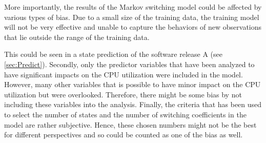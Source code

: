 More importantly, the results of the Markov switching model could
be affected by various types of bias. Due to a small size of the training
data, the training model will not be very effective and unable to
capture the behaviors of new observations that lie outside the range
of the training data. %
\begin{comment}
For this reason, a prediction for the new observations might not be
accurate as it should be. 
\end{comment}
This could be seen in a state prediction of the software release A
(see \ref{sec:Predict}). Secondly, only the predictor variables that
have been analyzed to have significant impacts on the CPU utilization
were included in the model. However, many other variables that is
possible to have minor impact on the CPU utilization but were overlooked.
Therefore, there might be some bias by not including these variables
into the analysis. Finally, the criteria that has been used to select
the number of states and the number of switching coefficients in the
model are rather subjective. Hence, these chosen numbers might not
be the best for different perspectives and so could be counted as
one of the bias as well. %
\begin{comment}
other factors which are not considered in the model might also be
the reason of causing a bias. The chosen predictor variables in this
thesis are variables that have a partial prior knowledge and have
been analyzed to have some significant impacts on CPU utilization.
However, it is possible that there are still some explanatory information
that is overlooked. Finally, selecting the number of states and switching
coefficients in the model could cause a bias as well. Finally, selecting
the number of states and the number of switching coefficients in the
model could cause a bias as well. 
\end{comment}

\begin{comment}
As described above, the small dataset is proven to cause several problems
and difficulty to the analysis. The size of data is crucial in statistical
analysis because more information can be extracted and used as an
input for the model to learn. 
\end{comment}


